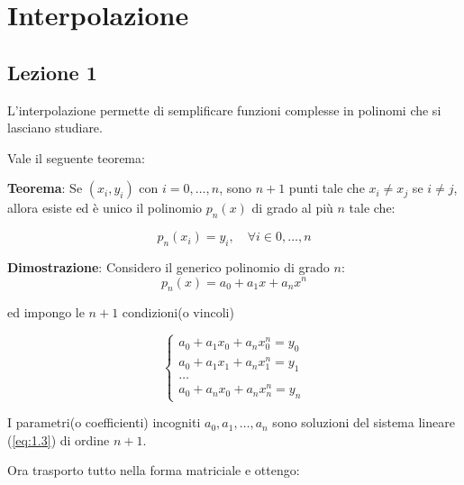 \chapter{Interpolazione}

\section{Lezione 1}

L'interpolazione permette di semplificare funzioni complesse in polinomi che si lasciano studiare.

Vale il seguente teorema:

\textbf{Teorema}: Se $(x_i, y_i)$ con $i = 0, \dots, n$, sono $n + 1$ punti tale che $x_i \neq x_j$
se $i \neq j$, allora esiste ed è unico il polinomio $p_n(x)$ di grado al più $n$ tale che:


\begin{equation}
    p_n(x_i) = y_i, \quad \forall i \in 0, \dots, n
\end{equation}


\textbf{Dimostrazione}: Considero il generico polinomio di grado $n$:
\begin{equation}
    p_n(x) = a_0 + a_1x + a_nx^n
\end{equation}

ed impongo le $n + 1$ condizioni(o vincoli)

\begin{equation}
    \label{eq:1.3}
    \begin{cases}
        a_0 + a_1x_0 + a_nx_0^n = y_0 \\
        a_0 + a_1x_1 + a_nx_1^n = y_1 \\
        \dots \\
        a_0 + a_nx_0 + a_nx_n^n = y_n 
        
    \end{cases}
\end{equation}

I parametri(o coefficienti) incogniti $a_0, a_1, \dots, a_n$ sono soluzioni del sistema lineare (\ref{eq:1.3})
di ordine $n + 1$.

Ora trasporto tutto nella forma matriciale e ottengo:


